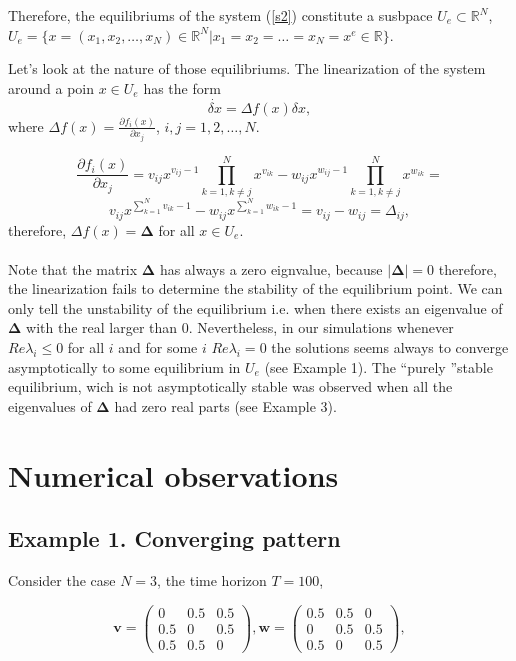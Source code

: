 \documentclass[a4paper,10pt, english]{article}
\newcommand{\D}{\displaystyle}
\begin{document}
Therefore, the equilibriums of the system (\ref{s2}) constitute a susbpace $U_e\subset\mathbb{R}^N$, $U_e = \{x = (x_1, x_2, \ldots, x_N)\in\mathbb{R}^N | x_1 =  x_2 = \ldots = x_N = x^e\in\mathbb{R}\}$.


\newpage
Let's look at the nature of those equilibriums. The linearization of the system around a poin $x\in U_e$ has the form
$$
\dot{\delta x} = \Delta f(x) \delta x,
$$
where $\D \Delta f(x) = \frac{\partial f_i(x)}{\partial x_j}$, $i, j =1, 2, \ldots, N.$

$$
\frac{\partial f_i(x)}{\partial x_j} = v_{ij}x^{v_{ij}-1}\prod_{k=1, k\neq j}^{N}x^{v_{ik}} - w_{ij}x^{w_{ij}-1}\prod_{k=1, k\neq j}^{N}x^{w_{ik}} =
$$
$$
v_{ij}x^{\sum_{k=1}^{N}v_{ik} - 1} - w_{ij}x^{\sum_{k=1}^{N}w_{ik} - 1} = v_{ij} - w_{ij} = \Delta_{ij},
$$
therefore,  $\Delta f(x) = \mathbf{\Delta}$ for all $x\in U_e$.
\\\\
Note that the matrix $\mathbf{\Delta}$ has always a zero eignvalue, because $|\mathbf{\Delta}| = 0$ therefore, the linearization fails to determine the stability of the equilibrium point. We can only tell the unstability
of the equilibrium i.e. when there exists an eigenvalue of $\mathbf{\Delta}$ with the real larger than 0.
Nevertheless, in our simulations whenever $Re\lambda_i \leq 0$ for all $i$ and for some $i$ $Re\lambda_i = 0$ the solutions seems always to converge asymptotically to some equilibrium in $U_e$ (see Example 1).
The \textquotedblleft purely \textquotedblright stable equilibrium, wich is not asymptotically stable  was observed when all the eigenvalues of $\mathbf{\Delta}$ had zero real parts (see Example 3).

\newpage
\section{Numerical observations}
\subsection{Example 1. Converging pattern}


Consider the case $N=3$, the time horizon $T = 100$,


\[\mathbf{v} =  \left( \begin{array}{ccc}
0 & 0.5 & 0.5 \\
0.5 & 0 & 0.5 \\
0.5 & 0.5 & 0 
\end{array} \right),
%
\mathbf{w} = 
\left( \begin{array}{ccc}
0.5 & 0.5 & 0 \\
0 & 0.5 & 0.5 \\
0.5 & 0 & 0.5 
\end{array} \right),
\]
\end{document}
